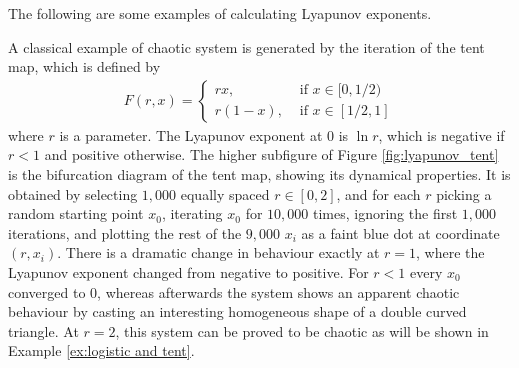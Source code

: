 The following are some examples of calculating Lyapunov exponents.

\begin{exmp}
	A classical example of chaotic system is generated by the iteration of the tent map, which is defined by
    \begin{align}
        F(r, x)= 
        \begin{cases}
            r x, & \text{ if } x \in [0,1/2) \\
            r (1-x), & \text{ if } x \in [1/2,1]
        \end{cases} \label{eq:tent}
    \end{align}
    where $r$ is a parameter.
	The Lyapunov exponent at $0$ is $\ln r$, which is negative if $r < 1$ and positive otherwise.
	The higher subfigure of Figure \ref{fig:lyapunov_tent} is the bifurcation diagram of the tent map, showing its dynamical properties. 
	It is obtained by selecting $1,000$ equally spaced $r \in [0,2]$, and for each $r$ picking a random starting point $x_0$, iterating $x_0$ for $10,000$ times, ignoring the first $1,000$ iterations, and plotting the rest of the $9,000$ $ x_i$ as a faint blue dot at coordinate $(r, x_i)$. 
	There is a dramatic change in behaviour exactly at $r=1$, where the Lyapunov exponent changed from negative to positive.
    For $r < 1$ every $x_0$ converged to $0$, whereas afterwards the system shows an apparent chaotic behaviour by casting an interesting homogeneous shape of a double curved triangle. At $r = 2$, this system can be proved to be chaotic as will be shown in Example \ref{ex:logistic and tent}.


\end{exmp}
